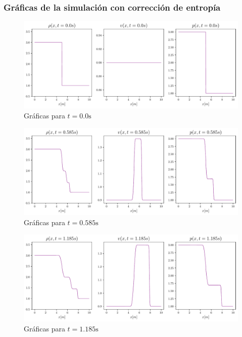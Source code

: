 \subsubsection{Gráficas de la simulación con corrección de entropía}
\begin{figure}[ht]
	\centering
	\includegraphics[width=1\linewidth]{../euler1D/plots_en_TDG/set3/leveque_con_entropy123/1.pdf}
	\caption{Gráficas para $t=0.0\unit{\s}$}
\end{figure}
\begin{figure}[ht]
	\includegraphics[width=1\linewidth]{../euler1D/plots_en_TDG/set3/leveque_con_entropy123/60.pdf}
	\caption{Gráficas para $t=0.585\unit{\s}$}
\end{figure}
\begin{figure}[ht]
	\includegraphics[width=1\linewidth]{../euler1D/plots_en_TDG/set3/leveque_con_entropy123/120.pdf}
	\caption{Gráficas para $t=1.185\unit{\s}$}
	\label{fig:ultima-sin-entropy}
\end{figure}\vspace{5cm}

